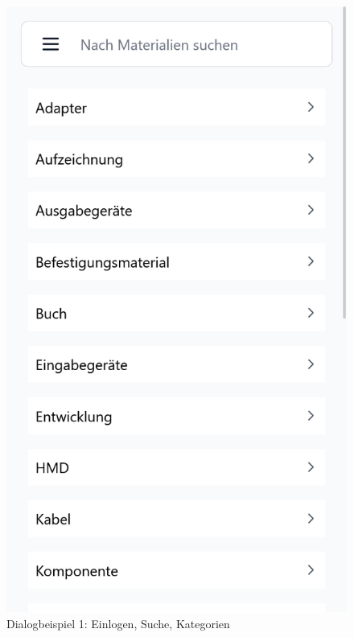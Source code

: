 \begin{figure}[p]
    \includegraphics[scale=0.17]{Bilder/Dialgobeispiel/Kategorien.png}
    \caption{Dialogbeispiel 1: Einlogen, Suche, Kategorien}\label{fig:login}
\end{figure}
